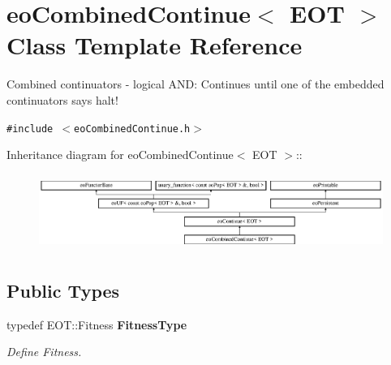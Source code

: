 \section{eo\-Combined\-Continue$<$ EOT $>$ Class Template Reference}
\label{classeo_combined_continue}
Combined continuators - logical AND: Continues until one of the embedded continuators says halt!  


{\tt \#include $<$eo\-Combined\-Continue.h$>$}

Inheritance diagram for eo\-Combined\-Continue$<$ EOT $>$::\begin{figure}[H]
\begin{center}
\leavevmode
\includegraphics[height=2.52252cm]{classeo_combined_continue}
\end{center}
\end{figure}
\subsection*{Public Types}
\begin{CompactItemize}
\item 
typedef EOT::Fitness {\bf Fitness\-Type}\label{classeo_combined_continue_w0}

\begin{CompactList}\small\item\em Define Fitness. \item\end{CompactList}\end{CompactItemize}
